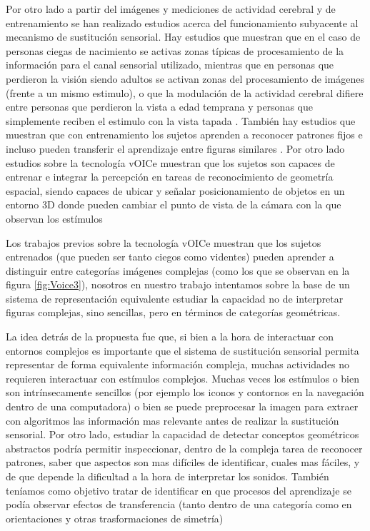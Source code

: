 \documentclass{article}
\begin{document}
    Por otro lado a partir del imágenes y mediciones de actividad cerebral y de entrenamiento se han realizado estudios acerca del funcionamiento subyacente al mecanismo de sustitución sensorial. Hay estudios que muestran que en el caso de personas ciegas de nacimiento se activas zonas típicas de procesamiento de la información para el canal sensorial utilizado, mientras que en personas que perdieron la visión siendo adultos se activan zonas del procesamiento de imágenes (frente a un mismo estimulo), o que la modulación de la actividad cerebral difiere entre personas que perdieron la vista a edad temprana y personas que simplemente reciben el estimulo con la vista tapada \cite{VoiceSubyacente1,VoiceSubyacente3}. También hay estudios que muestran que con entrenamiento los sujetos aprenden a reconocer patrones fijos e incluso pueden transferir el aprendizaje entre figuras similares \cite{VoiceSubyacente2}. Por otro lado estudios sobre la tecnología vOICe muestran que los sujetos son capaces de entrenar e integrar la percepción en tareas de reconocimiento de geometría espacial, siendo capaces de ubicar y señalar posicionamiento de objetos en un entorno 3D donde pueden cambiar el punto de vista de la cámara con la que observan los estímulos \cite{VoiceSubyacente4}
    
    Los trabajos previos sobre la tecnología vOICe muestran que los sujetos entrenados (que pueden ser tanto ciegos como videntes\cite{VoiceEntrenamiento1}) pueden aprender a distinguir entre categorías imágenes complejas \cite{VoiceEntrenamiento2} (como los que se observan en la figura \ref{fig:Voice3}), nosotros en nuestro trabajo intentamos sobre la base de un sistema de representación equivalente estudiar la capacidad no de interpretar figuras complejas, sino sencillas, pero en términos de categorías geométricas. 
    
    La idea detrás de la propuesta fue que, si bien a la hora de interactuar con entornos complejos es importante que el sistema de sustitución sensorial permita representar de forma equivalente información compleja, muchas actividades no requieren interactuar con estímulos complejos. Muchas veces los estímulos o bien son intrínsecamente sencillos (por ejemplo los iconos y contornos en la navegación dentro de una computadora) o bien se puede preprocesar la imagen para extraer con algoritmos las información mas relevante antes de realizar la sustitución sensorial. Por otro lado, estudiar la capacidad de detectar conceptos geométricos abstractos podría permitir inspeccionar, dentro de la compleja tarea de reconocer patrones, saber que aspectos son mas difíciles de identificar, cuales mas fáciles, y de que depende la dificultad a la hora de interpretar los sonidos. También teníamos como objetivo tratar de identificar en que procesos del aprendizaje se podía observar efectos de transferencia (tanto dentro de una categoría como en orientaciones y otras trasformaciones de simetría)
    
\end{document}
